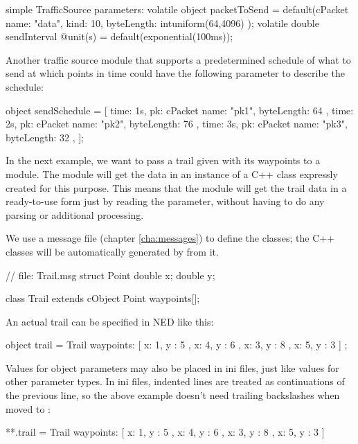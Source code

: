 \begin{ned}
simple TrafficSource {
    parameters:
    volatile object packetToSend = default(cPacket {
        name: "data",
        kind: 10,
        byteLength: intuniform(64,4096)
    });
    volatile double sendInterval @unit(s) = default(exponential(100ms));
}
\end{ned}

Another traffic source module that supports a predetermined schedule of what to
send at which points in time could have the following parameter to describe the
schedule:

\begin{ned}
object sendSchedule = [
    { time: 1s, pk: cPacket { name: "pk1", byteLength: 64 } },
    { time: 2s, pk: cPacket { name: "pk2", byteLength: 76 } },
    { time: 3s, pk: cPacket { name: "pk3", byteLength: 32 } },
];
\end{ned}

In the next example, we want to pass a trail given with its waypoints to a
module. The module will get the data in an instance of a  C++ class
expressly created for this purpose. This means that the module will get the
trail data in a ready-to-use form just by reading the parameter, without having
to do any parsing or additional processing.

We use a message file (chapter \ref{cha:messages}) to define the classes; the
C++ classes will be automatically generated by {\opp} from it.

\begin{msg}
// file: Trail.msg
struct Point {
    double x;
    double y;
}

class Trail extends cObject {
    Point waypoints[];
}
\end{msg}

An actual trail can be specified in NED like this:

\begin{ned}
object trail = Trail {
    waypoints: [
        { x: 1, y : 5 },
        { x: 4, y : 6 },
        { x: 3, y : 8 },
        { x: 5, y : 3 }
    ]
  };
\end{ned}

Values for object parameters may also be placed in ini files, just like values
for other parameter types. In ini files, indented lines are treated as
continuations of the previous line, so the above example doesn't need trailing
backslashes when moved to :

\begin{inifile}
**.trail = Trail {
        waypoints: [
            { x: 1, y : 5 },
            { x: 4, y : 6 },
            { x: 3, y : 8 },
            { x: 5, y : 3 }
        ]
      }
\end{inifile}

